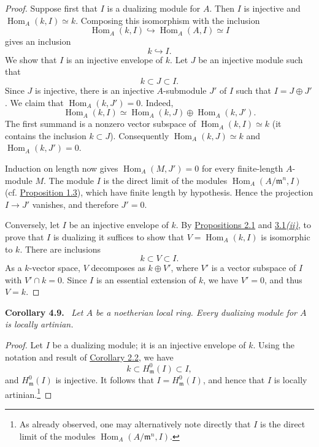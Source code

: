 \documentclass[11pt,a4paper,oneside]{book}
\providecommand{\srcpage}[1]{%
  \marginpar{\raggedright\scriptsize\color{gray}Original French p.~#1}}
\providecommand{\mideal}{\mathfrak m}
\providecommand{\Homop}{\operatorname{Hom}}
\newenvironment{sgastatement}[1]
  {\par\addvspace{0.8\baselineskip}\noindent\textbf{#1.}\ \itshape}
  {\par\addvspace{0.35\baselineskip}}
\theoremstyle{plain}
\theoremstyle{definition}
\theoremstyle{remark}
\begin{document}
\begin{proof}
Suppose first that $I$ is a dualizing module for $A$. Then $I$ is injective
and $\Homop_A(k,I)\simeq k$. Composing this isomorphism with the inclusion
\[
  \Homop_A(k,I)\hookrightarrow\Homop_A(A,I)\simeq I
\]
gives an inclusion
\[
  k\hookrightarrow I.
\]
We show that $I$ is an injective envelope of $k$. Let $J$ be an injective
module such that
\[
  k\subset J\subset I.
\]
Since $J$ is injective, there is an injective $A$-submodule $J'$ of $I$ such
that $I=J\oplus J'$. We claim that $\Homop_A(k,J')=0$. Indeed,
\[
  \Homop_A(k,I)\simeq\Homop_A(k,J)\oplus\Homop_A(k,J').
\]
The first summand is\srcpage{55} a nonzero vector subspace of
$\Homop_A(k,I)\simeq k$ (it contains the inclusion $k\subset J$).
Consequently $\Homop_A(k,J)\simeq k$ and $\Homop_A(k,J')=0$.

Induction on length now gives $\Homop_A(M,J')=0$ for every finite-length
$A$-module $M$. The module $I$ is the direct limit of the modules
$\Homop_A(A/\mideal^n,I)$ (cf. \hyperref[IV.1.3]{Proposition 1.3}), which have finite length by
hypothesis. Hence the projection $I\to J'$ vanishes, and therefore $J'=0$.

Conversely, let $I$ be an injective envelope of $k$. By \hyperref[IV.2.1]{Propositions 2.1}
and \hyperref[IV.3.1]{3.1\emph{(ii)}}, to prove that $I$ is dualizing it suffices to show that
$V=\Homop_A(k,I)$ is isomorphic to $k$. There are inclusions
\[
  k\subset V\subset I.
\]
As a $k$-vector space, $V$ decomposes as $k\oplus V'$, where $V'$ is a
vector subspace of $I$ with $V'\cap k=0$. Since $I$ is an essential
extension of $k$, we have $V'=0$, and thus $V=k$.
\end{proof}

\begin{sgastatement}{Corollary 4.9}
Let $A$ be a noetherian local ring. Every dualizing module for $A$ is
locally artinian.
\end{sgastatement}

\begin{proof}
Let $I$ be a dualizing module; it is an injective envelope of $k$. Using the
notation and result of \hyperref[IV.2.2]{Corollary 2.2}, we have
\[
  k\subset H^0_{\mideal}(I)\subset I,
\]
and $H^0_{\mideal}(I)$ is injective. It follows that
$I=H^0_{\mideal}(I)$, and hence that $I$ is locally artinian.\footnote{As
already observed, one may alternatively note directly that $I$ is the
direct limit of the modules $\Homop_A(A/\mideal^n,I)$.}
\end{proof}
\end{document}
